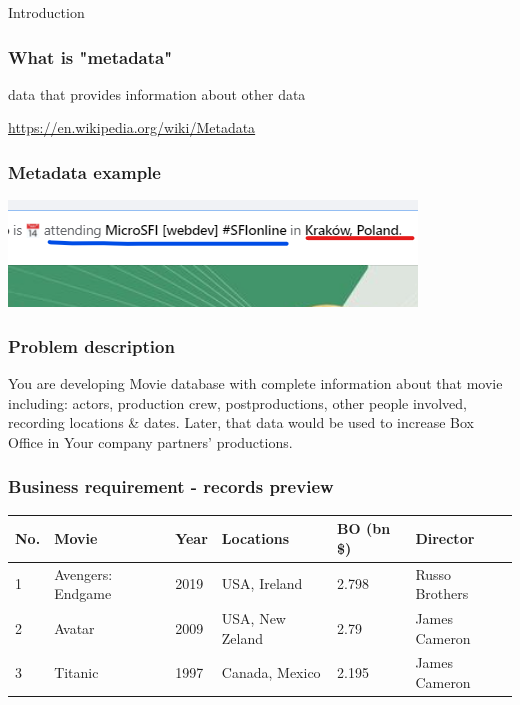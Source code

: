 \documentclass{beamer}
\begin{document}
\begin{section}{Introduction}

\begin{frame}

\frametitle{What is "metadata"}
\begin{displayquote}
data that provides information about other data
\end{displayquote}

\url{https://en.wikipedia.org/wiki/Metadata}

\end{frame}

\begin{frame}
\frametitle{Metadata example}

\centering
 \includegraphics{metadataExample.png}

\end{frame}

\begin{frame}
\frametitle{Problem description}
You are developing Movie database with complete information about that movie including: actors, production crew, postproductions, other people involved, recording locations \& dates. 
\newline \newline
Later, that data would be used to increase Box Office in Your company partners' productions.
\end{frame}

\begin{frame}
\frametitle{Business requirement - records preview\footnotemark[1] }
\begin{tabular}{| m{0.5cm} | m{3.25cm} | m{1cm} | m{2.25cm} | m{1cm} | m{1.5cm} |}
\hline
No. &  Movie & Year & Locations & BO (bn \$) & Director \\
\hline \hline
1 & Avengers: Endgame & 2019 & USA,  Ireland & 2.798 & Russo Brothers \\ \hline
2 & Avatar & 2009 & USA,  New Zeland & 2.79 & James Cameron \\  \hline
3 & Titanic & 1997 & Canada, Mexico & 2.195 & James Cameron \\  
\hline
\end{tabular}


\end{frame}
\end{section}
\end{document}
